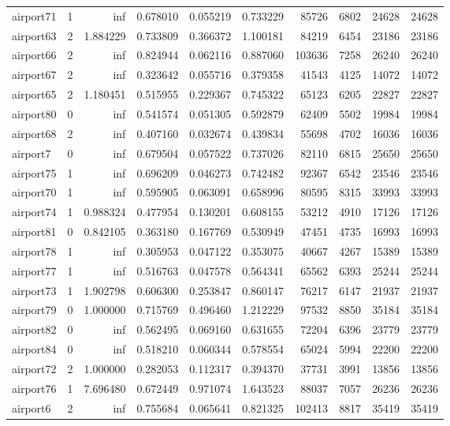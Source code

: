 \begin{longtable}{|l|r|r|r|r|r|r|r|r|r|}
airport71 & 1 & inf & 0.678010 & 0.055219 & 0.733229 & 85726 & 6802 & 24628 & 24628 \\
airport63 & 2 & 1.884229 & 0.733809 & 0.366372 & 1.100181 & 84219 & 6454 & 23186 & 23186 \\
airport66 & 2 & inf & 0.824944 & 0.062116 & 0.887060 & 103636 & 7258 & 26240 & 26240 \\
airport67 & 2 & inf & 0.323642 & 0.055716 & 0.379358 & 41543 & 4125 & 14072 & 14072 \\
airport65 & 2 & 1.180451 & 0.515955 & 0.229367 & 0.745322 & 65123 & 6205 & 22827 & 22827 \\
airport80 & 0 & inf & 0.541574 & 0.051305 & 0.592879 & 62409 & 5502 & 19984 & 19984 \\
airport68 & 2 & inf & 0.407160 & 0.032674 & 0.439834 & 55698 & 4702 & 16036 & 16036 \\
airport7 & 0 & inf & 0.679504 & 0.057522 & 0.737026 & 82110 & 6815 & 25650 & 25650 \\
airport75 & 1 & inf & 0.696209 & 0.046273 & 0.742482 & 92367 & 6542 & 23546 & 23546 \\
airport70 & 1 & inf & 0.595905 & 0.063091 & 0.658996 & 80595 & 8315 & 33993 & 33993 \\
airport74 & 1 & 0.988324 & 0.477954 & 0.130201 & 0.608155 & 53212 & 4910 & 17126 & 17126 \\
airport81 & 0 & 0.842105 & 0.363180 & 0.167769 & 0.530949 & 47451 & 4735 & 16993 & 16993 \\
airport78 & 1 & inf & 0.305953 & 0.047122 & 0.353075 & 40667 & 4267 & 15389 & 15389 \\
airport77 & 1 & inf & 0.516763 & 0.047578 & 0.564341 & 65562 & 6393 & 25244 & 25244 \\
airport73 & 1 & 1.902798 & 0.606300 & 0.253847 & 0.860147 & 76217 & 6147 & 21937 & 21937 \\
airport79 & 0 & 1.000000 & 0.715769 & 0.496460 & 1.212229 & 97532 & 8850 & 35184 & 35184 \\
airport82 & 0 & inf & 0.562495 & 0.069160 & 0.631655 & 72204 & 6396 & 23779 & 23779 \\
airport84 & 0 & inf & 0.518210 & 0.060344 & 0.578554 & 65024 & 5994 & 22200 & 22200 \\
airport72 & 2 & 1.000000 & 0.282053 & 0.112317 & 0.394370 & 37731 & 3991 & 13856 & 13856 \\
airport76 & 1 & 7.696480 & 0.672449 & 0.971074 & 1.643523 & 88037 & 7057 & 26236 & 26236 \\
airport6 & 2 & inf & 0.755684 & 0.065641 & 0.821325 & 102413 & 8817 & 35419 & 35419 \\

\end{longtable}
